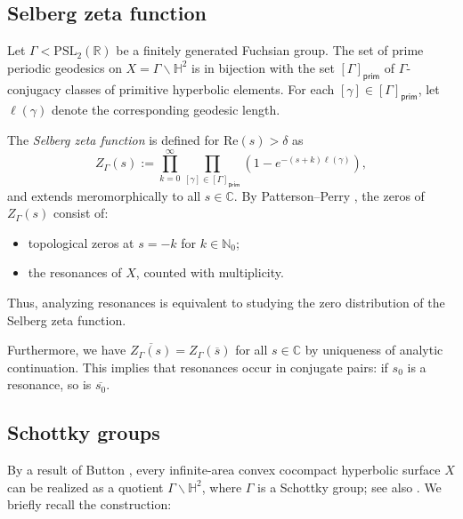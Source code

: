 \documentclass[12pt,letterpaper]{amsart}
\theoremstyle{plain}
\theoremstyle{definition}
\theoremstyle{remark}
\newcommand{\HH}{\mathbb{H}}
\newcommand{\CC}{\mathbb{C}}
\begin{document}
\subsection{Selberg zeta function}\label{sec:SelbergZeta}
Let $\Gamma < \mathrm{PSL}_2(\mathbb{R})$ be a finitely generated Fuchsian group. The set of prime periodic geodesics on $X = \Gamma \backslash \HH^2$ is in bijection with the set $[\Gamma]_{\mathsf{prim}}$ of $\Gamma$-conjugacy classes of primitive hyperbolic elements. For each $[\gamma] \in [\Gamma]_{\mathsf{prim}}$, let $\ell(\gamma)$ denote the corresponding geodesic length.

The \textit{Selberg zeta function} is defined for $\mathrm{Re}(s) > \delta$ as
\begin{equation}\label{selbergZetaDefi}
Z_\Gamma(s) := \prod_{k=0}^\infty \prod_{[\gamma] \in [\Gamma]_{\mathsf{prim}}} \left( 1 - e^{-(s+k)\ell(\gamma)} \right),
\end{equation}
and extends meromorphically to all $s \in \CC$. By Patterson–Perry \cite{Patt_Perry}, the zeros of $Z_\Gamma(s)$ consist of:
\begin{itemize}
  \item topological zeros at $s = -k$ for $k \in \mathbb{N}_0$;
  \item the resonances of $X$, counted with multiplicity.
\end{itemize}
Thus, analyzing resonances is equivalent to studying the zero distribution of the Selberg zeta function.

Furthermore, we have $\overline{Z_\Gamma(s)} = Z_\Gamma(\overline{s})$ for all $s \in \CC$ by uniqueness of analytic continuation. This implies that resonances occur in conjugate pairs: if $s_0$ is a resonance, so is $\overline{s_0}$.

\subsection{Schottky groups}\label{sec:SchottkyGroups}
By a result of Button \cite{Button}, every infinite-area convex cocompact hyperbolic surface $X$ can be realized as a quotient $\Gamma \backslash \HH^2$, where $\Gamma$ is a Schottky group; see also \cite[Theorem~15.3]{Borthwick_book}. We briefly recall the construction:
\end{document}
